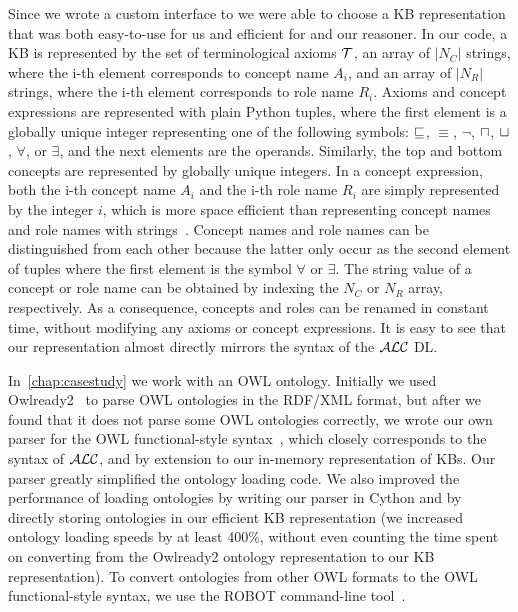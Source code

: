 Since we wrote a custom interface to \factpp{} we were able to choose a KB representation that was both easy-to-use for us and efficient for \factpp{} and our reasoner.
In our code, a KB is represented by the set of terminological axioms $\mathcal{T}$, an array of $|N_C|$ strings, where the i-th element corresponds to concept name $A_i$, and an array of $|N_R|$ strings, where the i-th element corresponds to role name $R_i$.
Axioms and concept expressions are represented with plain Python tuples, where the first element is a globally unique integer representing one of the following symbols: $\sqsubseteq$, $\equiv$, $\lnot$, $\sqcap$, $\sqcup$, $\forall$, or $\exists$, and the next elements are the operands.
Similarly, the top and bottom concepts are represented by globally unique integers.
In a concept expression, both the i-th concept name $A_i$ and the i-th role name $R_i$ are simply represented by the integer $i$, which is more space efficient than representing concept names and role names with strings~\cite{potoniec_inductive_2022}.
Concept names and role names can be distinguished from each other because the latter only occur as the second element of tuples where the first element is the symbol $\forall$ or $\exists$.
The string value of a concept or role name can be obtained by indexing the $N_C$ or $N_R$ array, respectively.
As a consequence, concepts and roles can be renamed in constant time, without modifying any axioms or concept expressions.
It is easy to see that our representation almost directly mirrors the syntax of the $\mathcal{ALC}$ DL.

In~\autoref{chap:casestudy} we work with an OWL ontology.
Initially we used Owlready2~\cite{lamy_owlready_2017} to parse OWL ontologies in the RDF/XML format, but after we found that it does not parse some OWL ontologies correctly, we wrote our own parser for the OWL functional-style syntax~\cite{noauthor_owl_2012}, which closely corresponds to the syntax of $\mathcal{ALC}$, and by extension to our in-memory representation of KBs.
Our parser greatly simplified the ontology loading code.
We also improved the performance of loading ontologies by writing our parser in Cython and by directly storing ontologies in our efficient KB representation (we increased ontology loading speeds by at least 400\%, without even counting the time spent on converting from the Owlready2 ontology representation to our KB representation).
To convert ontologies from other OWL formats to the OWL functional-style syntax, we use the ROBOT command-line tool~\cite{jackson_robot_2019}.

